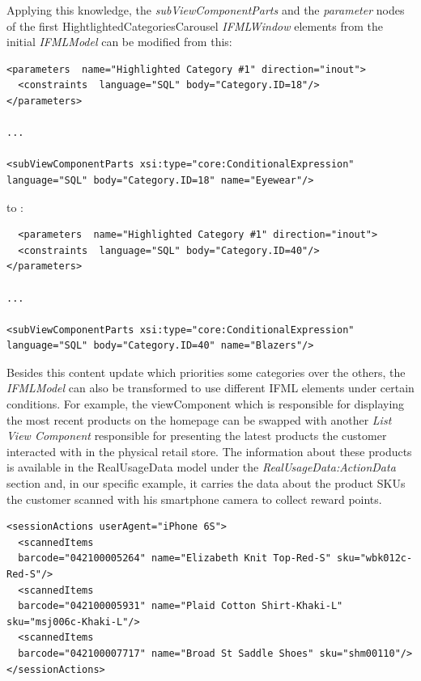 Applying this knowledge, the \textit{subViewComponentParts} and the \textit{parameter} nodes of the first HightlightedCategoriesCarousel \textit{IFMLWindow} elements from the initial \textit{IFMLModel} can be modified from this:

\vspace{0.5cm}
\lstset{language=XML}
\begin{lstlisting} 
<parameters  name="Highlighted Category #1" direction="inout">
  <constraints  language="SQL" body="Category.ID=18"/>
</parameters>

...

<subViewComponentParts xsi:type="core:ConditionalExpression"  language="SQL" body="Category.ID=18" name="Eyewear"/>
\end{lstlisting}
\vspace{0.5cm}

to :

\vspace{0.5cm}
\lstset{language=XML}
\begin{lstlisting} 
  <parameters  name="Highlighted Category #1" direction="inout">
  <constraints  language="SQL" body="Category.ID=40"/>
</parameters>

...

<subViewComponentParts xsi:type="core:ConditionalExpression"  language="SQL" body="Category.ID=40" name="Blazers"/>
\end{lstlisting}
\vspace{0.5cm}

Besides this content update which priorities some categories over the others, the \textit{IFMLModel} can also be transformed to use different IFML elements under certain conditions. For example, the viewComponent which is responsible for displaying the most recent products on the homepage can be swapped with another \textit{List View Component} responsible for presenting the latest products the customer interacted with in the physical retail store. The information about these products is available in the RealUsageData model under the \textit{RealUsageData:ActionData} section and, in our specific example, it carries the data about the product SKUs the customer scanned with his smartphone camera to collect reward points.

\vspace{0.5cm}
\lstset{language=XML}
\begin{lstlisting} 
<sessionActions userAgent="iPhone 6S">
  <scannedItems 
  barcode="042100005264" name="Elizabeth Knit Top-Red-S" sku="wbk012c-Red-S"/>
  <scannedItems 
  barcode="042100005931" name="Plaid Cotton Shirt-Khaki-L" sku="msj006c-Khaki-L"/>
  <scannedItems 
  barcode="042100007717" name="Broad St Saddle Shoes" sku="shm00110"/>
</sessionActions>
\end{lstlisting}
\vspace{0.5cm}


